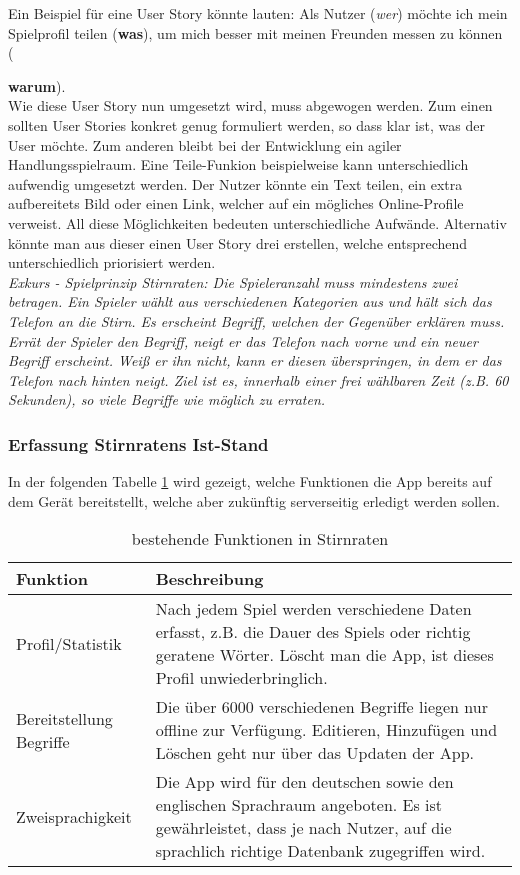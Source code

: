 Ein Beispiel für eine User Story könnte lauten: Als Nutzer (\textit{wer}) möchte ich mein Spielprofil teilen (\textbf{was}), um mich besser mit meinen Freunden messen zu können ({\textbf{warum}).\\
	
Wie diese User Story nun umgesetzt wird, muss abgewogen werden. Zum einen sollten User Stories konkret genug formuliert werden, so dass klar ist, was der User möchte. Zum anderen bleibt bei der Entwicklung ein agiler Handlungsspielraum.\cite{UserStoryMapping} Eine Teile-Funkion beispielweise kann unterschiedlich aufwendig umgesetzt werden. Der Nutzer könnte ein Text teilen, ein extra aufbereitets Bild oder einen Link, welcher auf ein mögliches Online-Profile verweist. All diese Möglichkeiten bedeuten unterschiedliche Aufwände. Alternativ könnte man aus dieser einen User Story drei erstellen, welche entsprechend unterschiedlich priorisiert werden.\\

\textit{Exkurs - Spielprinzip Stirnraten: Die Spieleranzahl muss mindestens zwei betragen. Ein Spieler wählt aus verschiedenen Kategorien aus und hält sich das Telefon an die Stirn. Es erscheint Begriff, welchen der Gegenüber erklären muss. Errät der Spieler den Begriff, neigt er das Telefon nach vorne und ein neuer Begriff erscheint. Weiß er ihn nicht, kann er diesen überspringen, in dem er das Telefon nach hinten neigt. Ziel ist es, innerhalb einer frei wählbaren Zeit (z.B. 60 Sekunden), so viele Begriffe wie möglich zu erraten.}

\subsubsection{Erfassung Stirnratens Ist-Stand}

In der folgenden Tabelle \ref{tab:bestehende_funktionen} wird gezeigt, welche Funktionen die App bereits auf dem Gerät bereitstellt, welche aber zukünftig serverseitig erledigt werden sollen. 

\begin{table}[H]
	\begin{center}
		\begin{tabular}{p{3cm}p{10cm}}
			Funktion & Beschreibung \\ \hline
			Profil/Statistik & Nach jedem Spiel werden verschiedene Daten erfasst, z.B. die Dauer des Spiels oder richtig geratene Wörter. Löscht man die App, ist dieses Profil unwiederbringlich. \\
			Bereitstellung Begriffe & Die über 6000 verschiedenen Begriffe liegen nur offline zur Verfügung. Editieren, Hinzufügen und Löschen geht nur über das Updaten der App.\\
			Zweisprachigkeit & Die App wird für den deutschen sowie den englischen Sprachraum angeboten. Es ist gewährleistet, dass je nach Nutzer, auf die sprachlich richtige Datenbank zugegriffen wird.\\
		\end{tabular}
	\end{center}
	\caption[bestehende Funktionen in Stirnraten]{bestehende Funktionen in Stirnraten}
	\label{tab:bestehende_funktionen} 
\end{table}

}
